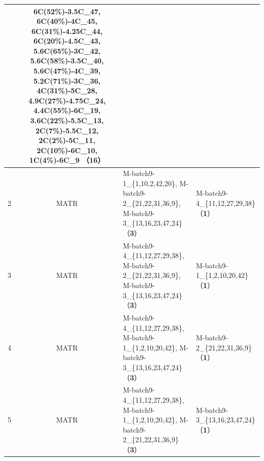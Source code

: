 \documentclass[UTF8,lettersize,journal]{IEEEtran}
\begin{document}
\begin{table}[htbp]
\begin{threeparttable}
\begin{tabularx}{\textwidth}{ccXX}
        & 6C(52\%)-3.5C\_47, 6C(40\%)-4C\_45,
        6C(31\%)-4.25C\_44, \newline
        6C(20\%)-4.5C\_43, 5.6C(65\%)-3C\_42, 5.6C(58\%)-3.5C\_40, \newline
        5.6C(47\%)-4C\_39, 5.2C(71\%)-3C\_36, 4C(31\%)-5C\_28, \newline
        4.9C(27\%)-4.75C\_24, 4.4C(55\%)-6C\_19, 3.6C(22\%)-5.5C\_13, \newline
        2C(7\%)-5.5C\_12, 2C(2\%)-5C\_11, 2C(10\%)-6C\_10, \newline
        1C(4\%)-6C\_9 （\textbf{16}） \\
        \midrule
        2     & MATR  & M-batch9-1\_\{1,10,2,42,20\}, M-batch9-2\_\{21,22,31,36,9\}, \newline M-batch9-3\_\{13,16,23,47,24\} （\textbf{3}） & M-batch9-4\_\{11,12,27,29,38\} （\textbf{1}） \\
        \midrule
        3     & MATR  & M-batch9-4\_\{11,12,27,29,38\}, M-batch9-2\_\{21,22,31,36,9\}, \newline M-batch9-3\_\{13,16,23,47,24\} （\textbf{3}） & M-batch9-1\_\{1,2,10,20,42\} （\textbf{1}） \\
        \midrule
        4     & MATR  & M-batch9-4\_\{11,12,27,29,38\}, M-batch9-1\_\{1,2,10,20,42\}, \newline M-batch9-3\_\{13,16,23,47,24\} （\textbf{3}） & M-batch9-2\_\{21,22,31,36,9\} （\textbf{1}） \\
        \midrule
        5     & MATR  & M-batch9-4\_\{11,12,27,29,38\}, M-batch9-1\_\{1,2,10,20,42\}, \newline M-batch9-2\_\{21,22,31,36,9\} （\textbf{3}） & M-batch9-3\_\{13,16,23,47,24\} （\textbf{1}） \\

\end{tabularx}
\end{threeparttable}
\end{table}
\end{document}
